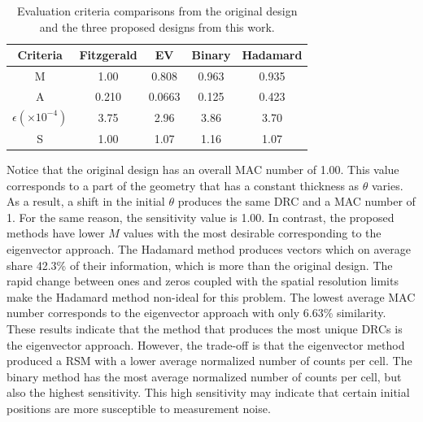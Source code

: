 \documentclass[3p,times]{elsarticle}
\begin{document}
\begin{table}[ht]
\caption{Evaluation criteria comparisons from the original design and the three proposed designs from this work.} %
\centering %
\begin{tabular}{|c|c|c|c|c|} %
\hline
Criteria & Fitzgerald & EV & Binary & Hadamard\\
\hline
M & 1.00 & 0.808 & 0.963 & 0.935\\
\hline
A & 0.210 & 0.0663 & 0.125 & 0.423 \\
\hline
$\epsilon \left(\times 10^{-4}\right)$ & 3.75 & 2.96 & 3.86 & 3.70\\
\hline
S & 1.00 & 1.07 & 1.16 & 1.07 \\
\hline
\end{tabular}
\label{table:results} %
\end{table}

Notice that the original design has an overall MAC number of 1.00. 
This value corresponds to a part of the geometry that has a constant thickness as $\theta$ varies.  
As a result, a shift in the initial $\theta$ produces the same DRC and a MAC number of 1.  
For the same reason, the sensitivity value is 1.00.  
In contrast, the proposed methods have lower $M$ values with the most desirable corresponding to the eigenvector approach.  
The Hadamard method produces vectors which on average share 42.3\% of their information, which is more than the original design.  
The rapid change between ones and zeros coupled with the spatial resolution limits make the Hadamard method non-ideal for this problem.  
The lowest average MAC number corresponds to the eigenvector approach with only 6.63\% similarity.  
These results indicate that the method that produces the most unique
DRCs is the eigenvector approach.  
However, the trade-off is that the eigenvector method produced a RSM with a lower average normalized number of counts per cell.  
The binary method has the most average normalized number of counts per cell, but also the highest sensitivity.  
This high sensitivity may indicate that certain initial positions are more susceptible to measurement noise.
\end{document}
